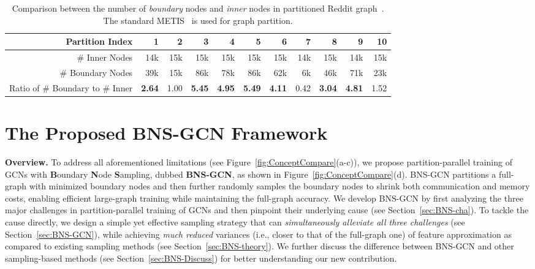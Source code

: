 \documentclass{article}
\newcommand{\niparagraph}[1]{\noindent\textbf{#1}}
\begin{document}
\begin{table*}[t]
\centering
\caption{Comparison between the number of \textit{boundary} nodes and \textit{inner} nodes in partitioned Reddit graph~\citep{hamilton2017inductive}. The standard METIS~\citep{karypis1998fast} is used for graph partition.}
\label{tab:partition}
\setlength{\tabcolsep}{0.8em}
\begin{tabular}{rrrrrrrrrrr}
\hline
Partition Index                  & 1    & 2    & 3    & 4    & 5    & 6    & 7    & 8    & 9    & 10   \\
\hline 
\# Inner Nodes                   & 14k  & 15k  & 15k  & 15k  & 15k  & 15k  & 14k  & 15k  & 14k  & 15k  \\
\# Boundary Nodes                & 39k  & 15k  & 86k  & 78k  & 86k  & 62k  & 6k   & 46k  & 71k  & 23k  \\
Ratio of \# Boundary to \# Inner & \textbf{2.64} & 1.00 & \textbf{5.45} & \textbf{4.95} & \textbf{5.49} & \textbf{4.11} & 0.42 & \textbf{3.04} & \textbf{4.81} & 1.52 \\
\hline
\end{tabular}
\end{table*}


\section{The Proposed BNS-GCN Framework}
\label{sec:method}
\niparagraph{Overview.} 
To address all aforementioned limitations (see Figure~\ref{fig:ConceptCompare}(a-c)), we propose partition-parallel training of GCNs with \textbf{B}oundary \textbf{N}ode \textbf{S}ampling, dubbed \textbf{BNS-GCN}, as shown in Figure~\ref{fig:ConceptCompare}(d).
BNS-GCN partitions a full-graph with minimized boundary nodes and then further randomly samples the boundary nodes to shrink both communication and memory costs, enabling efficient large-graph training while maintaining the full-graph accuracy.
We develop BNS-GCN by first analyzing the three major challenges in partition-parallel training of GCNs and then pinpoint their underlying cause (see Section~\ref{sec:BNS-cha}).
To tackle the cause directly, we design a simple yet effective sampling strategy that can \textit{simultaneously alleviate all three challenges} (see Section~\ref{sec:BNS-GCN}), while achieving \textit{much reduced} variances (i.e., closer to that of the full-graph one) of feature approximation as compared to existing sampling methods (see Section~\ref{sec:BNS-theory}). 
We further discuss the difference between BNS-GCN and other sampling-based methods (see Section~\ref{sec:BNS-Discuss}) for better understanding our new contribution.
\end{document}
